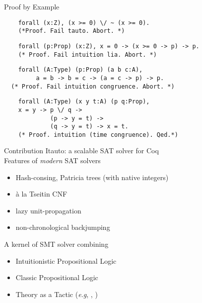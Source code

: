 \documentclass{beamer}
\begin{document}
\begin{frame}[fragile]{Proof by Example}
  \begin{verbatim}
    forall (x:Z), (x >= 0) \/ ~ (x >= 0).
    (*Proof. Fail tauto. Abort. *)
  \end{verbatim}
  \bigskip

  \begin{verbatim}
    forall (p:Prop) (x:Z), x = 0 -> (x >= 0 -> p) -> p.
    (* Proof. Fail intuition lia. Abort. *)
  \end{verbatim}
  \bigskip
  
  \begin{verbatim}
    forall (A:Type) (p:Prop) (a b c:A),
         a = b -> b = c -> (a = c -> p) -> p.
  (* Proof. Fail intuition congruence. Abort. *)
  \end{verbatim}
  \bigskip
  
  \begin{verbatim}
    forall (A:Type) (x y t:A) (p q:Prop),
    x = y -> p \/ q ->
             (p -> y = t) ->
             (q -> y = t) -> x = t.
    (* Proof. intuition (time congruence). Qed.*)
  \end{verbatim}

\end{frame}

\begin{frame}{Contribution}
  Itauto: a scalable SAT solver for Coq\\

  Features of \emph{modern} SAT solvers
  \begin{itemize}
  \item Hash-consing, Patricia trees (with native integers)
  \item à la Tseitin CNF
  \item lazy unit-propagation
  \item non-chronological backjumping
  \end{itemize}
  \bigskip
  
  A kernel of SMT solver combining
  \begin{itemize}
  \item Intuitionistic Propositional Logic 
  \item Classic Propositional Logic
  \item Theory as a Tactic (\emph{e.g}, , )
  \end{itemize}
  
\end{frame}
\end{document}
